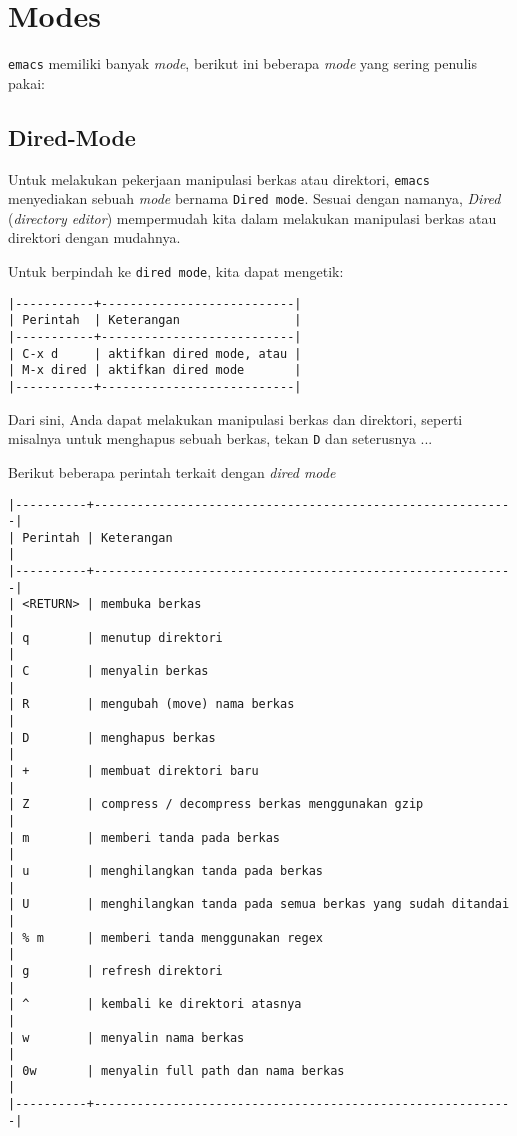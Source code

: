 \documentclass{article}
\begin{document}
\section{Modes}
\verb=emacs= memiliki banyak \emph{mode}, berikut ini beberapa \emph{mode} yang sering
penulis pakai:

\subsection{Dired-Mode}
Untuk melakukan pekerjaan manipulasi berkas atau direktori, \verb=emacs=
menyediakan sebuah \emph{mode} bernama \verb=Dired mode=. Sesuai dengan namanya,
\emph{Dired} (\emph{directory editor}) mempermudah kita dalam melakukan manipulasi berkas 
atau direktori dengan mudahnya.

Untuk berpindah ke \verb=dired mode=, kita dapat mengetik:

\begin{verbatim}
|-----------+---------------------------|
| Perintah  | Keterangan                |
|-----------+---------------------------|
| C-x d     | aktifkan dired mode, atau |
| M-x dired | aktifkan dired mode       |
|-----------+---------------------------|
\end{verbatim}

Dari sini, Anda dapat melakukan manipulasi berkas dan direktori, seperti 
misalnya untuk menghapus sebuah berkas, tekan \verb=D= dan seterusnya ...

Berikut beberapa perintah terkait dengan \emph{dired mode}

\begin{verbatim}
|----------+-----------------------------------------------------------|
| Perintah | Keterangan                                                |
|----------+-----------------------------------------------------------|
| <RETURN> | membuka berkas                                            |
| q        | menutup direktori                                         |
| C        | menyalin berkas                                           |
| R        | mengubah (move) nama berkas                               |
| D        | menghapus berkas                                          |
| +        | membuat direktori baru                                    |
| Z        | compress / decompress berkas menggunakan gzip             |
| m        | memberi tanda pada berkas                                 |
| u        | menghilangkan tanda pada berkas                           |
| U        | menghilangkan tanda pada semua berkas yang sudah ditandai |
| % m      | memberi tanda menggunakan regex                           |
| g        | refresh direktori                                         |
| ^        | kembali ke direktori atasnya                              |
| w        | menyalin nama berkas                                      |
| 0w       | menyalin full path dan nama berkas                        |
|----------+-----------------------------------------------------------|
\end{verbatim}
\end{document}
